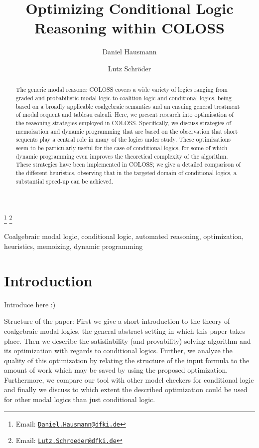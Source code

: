 \documentclass{entcs} \usepackage{entcsmacro}
\begin{document}
\begin{frontmatter}
  \title{Optimizing Conditional Logic Reasoning within COLOSS}
  \author[DFKI]{Daniel Hausmann}
  \author[DFKI,UBremen]{Lutz Schr\"oder}
  \address[DFKI]{DFKI Bremen, SKS}
  \address[UBremen]{Department of Mathematics and Computer Science, Universit\"at Bremen, Germany}
  \thanks[myemail]{Email: \href{mailto:Daniel.Hausmann@dfki.de} {\texttt{\normalshape Daniel.Hausmann@dfki.de}}}
  \thanks[coemail]{Email: \href{mailto:Lutz.Schroeder@dfki.de} {\texttt{\normalshape Lutz.Schroeder@dfki.de}}}
\begin{abstract} 
  The generic modal reasoner COLOSS covers a wide variety of logics
  ranging from graded and probabilistic modal logic to coalition logic
  and conditional logics, being based on a broadly applicable
  coalgebraic semantics and an ensuing general treatment of modal
  sequent and tableau calculi. Here, we present research into
  optimisation of the reasoning strategies employed in
  COLOSS. Specifically, we discuss strategies of memoisation and
  dynamic programming that are based on the observation that short
  sequents play a central role in many of the logics under
  study. These optimisations seem to be particularly useful for the
  case of conditional logics, for some of which dynamic programming
  even improves the theoretical complexity of the algorithm. These
  strategies have been implemented in COLOSS; we give a detailed
  comparison of the different heuristics, observing that in the
  targeted domain of conditional logics, a substantial speed-up can be
  achieved.
\end{abstract}
\begin{keyword}
  Coalgebraic modal logic, conditional logic, automated reasoning,
  optimization, heuristics, memoizing, dynamic programming
\end{keyword}
\end{frontmatter}
\section{Introduction}\label{intro}

Introduce here :)

Structure of the paper: First we give a short introduction to
the theory of coalgebraic modal logics, the general abstract
setting in which this paper takes place. Then we describe the
satisfiability (and provability) solving algorithm and its
optimization with regards to conditional logics. Further, we 
analyze the quality of this optimization by relating
the structure of the input formula to the amount of work which may
be saved by using the proposed optimization. Furthermore,
we compare our tool with other model checkers for conditional logic
and finally we discuss to which extent the described
optimization could be used for other modal logics than just
conditional logic.
 
\end{document}
